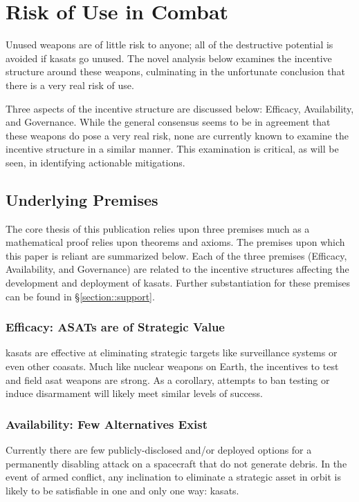 \section{Risk of Use in Combat}

Unused weapons are of little risk to anyone; all of the destructive
potential is avoided if \acp{kasat} go unused.  The novel analysis
below examines the incentive structure around these weapons,
culminating in the unfortunate conclusion that there is a very real
risk of use.

Three aspects of the incentive structure are discussed below:
Efficacy, Availability, and Governance.  While the general consensus
seems to be in agreement that these weapons do pose a very real risk,
none are currently known to examine the incentive structure in a
similar manner.  This examination is critical, as will be seen, in
identifying actionable mitigations.


\subsection{Underlying Premises}

The core thesis of this publication relies upon three premises much as
a mathematical proof relies upon theorems and axioms.  The premises
upon which this paper is reliant are summarized below.  Each of the
three premises (Efficacy, Availability, and Governance) are related to
the incentive structures affecting the development and deployment of
\acp{kasat}.  Further substantiation for these premises can be found
in \S\ref{section::support}.

\subsubsection{Efficacy: ASATs are of Strategic Value}
\acp{kasat} are effective at eliminating strategic targets like
surveillance systems or even other \acp{coasat}.  Much like nuclear
weapons on Earth, the incentives to test and field \ac{asat} weapons
are strong.  As a corollary, attempts to ban testing or induce
disarmament will likely meet similar levels of success.

\subsubsection{Availability: Few Alternatives Exist}
Currently there are few publicly-disclosed and/or deployed options for
a permanently disabling attack on a spacecraft that do not generate
debris.  In the event of armed conflict, any inclination to eliminate
a strategic asset in orbit is likely to be satisfiable in one and only
one way: \acp{kasat}.

